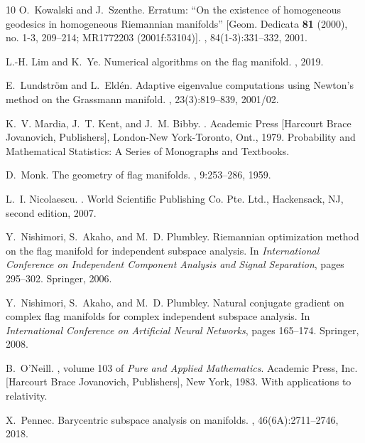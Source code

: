 \documentclass[11pt,reqno]{amsart}%
\theoremstyle{definition}
\theoremstyle{remark}
\begin{document}
\begin{thebibliography}{10}
O.~Kowalski and J.~Szenthe.
\newblock Erratum: ``{O}n the existence of homogeneous geodesics in homogeneous
  {R}iemannian manifolds'' [{G}eom. {D}edicata {\bf 81} (2000), no. 1-3,
  209--214; {MR}1772203 (2001f:53104)].
, 84(1-3):331--332, 2001.

L.-H. Lim and K.~Ye.
\newblock Numerical algorithms on the flag manifold.
, 2019.

E.~Lundstr\"{o}m and L.~Eld\'{e}n.
\newblock Adaptive eigenvalue computations using {N}ewton's method on the
  {G}rassmann manifold.
, 23(3):819--839, 2001/02.

K.~V. Mardia, J.~T. Kent, and J.~M. Bibby.
.
\newblock Academic Press [Harcourt Brace Jovanovich, Publishers], London-New
  York-Toronto, Ont., 1979.
\newblock Probability and Mathematical Statistics: A Series of Monographs and
  Textbooks.

D.~Monk.
\newblock The geometry of flag manifolds.
, 9:253--286, 1959.

L.~I. Nicolaescu.
.
\newblock World Scientific Publishing Co. Pte. Ltd., Hackensack, NJ, second
  edition, 2007.

Y.~Nishimori, S.~Akaho, and M.~D. Plumbley.
\newblock Riemannian optimization method on the flag manifold for independent
  subspace analysis.
\newblock In {\em International Conference on Independent Component Analysis
  and Signal Separation}, pages 295--302. Springer, 2006.

Y.~Nishimori, S.~Akaho, and M.~D. Plumbley.
\newblock Natural conjugate gradient on complex flag manifolds for complex
  independent subspace analysis.
\newblock In {\em International Conference on Artificial Neural Networks},
  pages 165--174. Springer, 2008.

B.~O'Neill.
, volume 103 of {\em Pure and Applied
  Mathematics}.
\newblock Academic Press, Inc. [Harcourt Brace Jovanovich, Publishers], New
  York, 1983.
\newblock With applications to relativity.

X.~Pennec.
\newblock Barycentric subspace analysis on manifolds.
, 46(6A):2711--2746, 2018.


\end{thebibliography}
\end{document}
